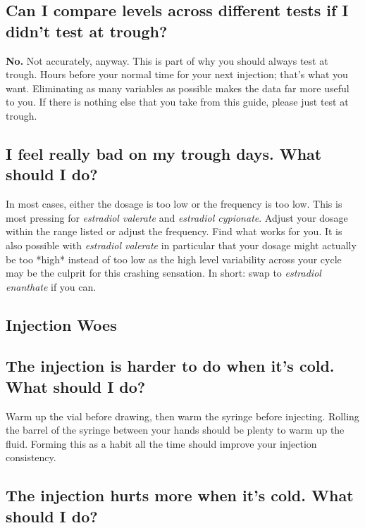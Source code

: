 \documentclass{article}
\begin{document}
{{\subsection{Can I compare levels across different tests if I didn’t test at trough?}

\textbf{No.} Not accurately, anyway. This is part of why you should always test at trough. Hours before your normal time for your next injection; that’s what you want. Eliminating as many variables as possible makes the data far more useful to you. If there is nothing else that you take from this guide, please just test at trough.

\subsection{I feel really bad on my trough days. What should I do?}\label{7-3}

In most cases, either the dosage is too low or the frequency is too low. This is most pressing for \textit{estradiol valerate} and \textit{estradiol cypionate}. Adjust your dosage within the range listed or adjust the frequency. Find what works for you. It is also possible with \textit{estradiol valerate} in particular that your dosage might actually be too *high* instead of too low as the high level variability across your cycle may be the culprit for this crashing sensation. In short: swap to \textit{estradiol enanthate} if you can.

\subsection*{Injection Woes}

\subsection{The injection is harder to do when it’s cold. What should I do?}

Warm up the vial before drawing, then warm the syringe before injecting. Rolling the barrel of the syringe between your hands should be plenty to warm up the fluid. Forming this as a habit all the time should improve your injection consistency.

\subsection{The injection hurts more when it’s cold. What should I do?}

}}
\end{document}
